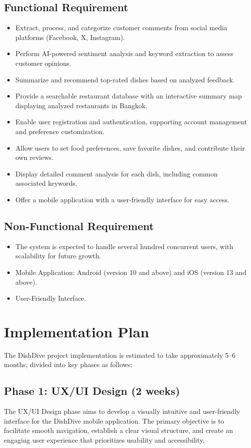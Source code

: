 \subsection*{Functional Requirement}
\begin{itemize}
\item Extract, process, and categorize customer comments from social media platforms (Facebook, X, Instagram).
\item Perform AI-powered sentiment analysis and keyword extraction to assess customer opinions.
\item Summarize and recommend top-rated dishes based on analyzed feedback.
\item Provide a searchable restaurant database with an interactive summary map displaying analyzed restaurants in Bangkok.
\item Enable user registration and authentication, supporting account management and preference customization.
\item Allow users to set food preferences, save favorite dishes, and contribute their own reviews.
\item Display detailed comment analysis for each dish, including common associated keywords.
\item Offer a mobile application with a user-friendly interface for easy access.
\end{itemize}

\subsection*{Non-Functional Requirement}
\begin{itemize}
\item The system is expected to handle several hundred concurrent users, with scalability for future growth.
\item Mobile Application: Android (version 10 and above) and iOS (version 13 and above).
\item User-Friendly Interface.
\end{itemize}

\section{Implementation Plan}
The DishDive project implementation is estimated to take approximately 5--6 months, divided into key phases as follows:

\subsection*{Phase 1: UX/UI Design (2 weeks)}
The UX/UI Design phase aims to develop a visually intuitive and user-friendly interface for the DishDive mobile application. The primary objective is to facilitate smooth navigation, establish a clear visual structure, and create an engaging user experience that prioritizes usability and accessibility.

